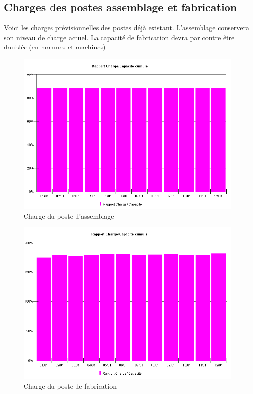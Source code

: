 \documentclass[a4paper]{../TPInsa}
\begin{document}
	\subsection{Charges des postes assemblage et fabrication}
	Voici les charges prévisionnelles des postes déjà existant. L'assemblage conservera son niveau de charge actuel. La capacité de fabrication devra par contre être doublée (en hommes et machines). 
	
	\begin{figure}[H]
	\centering
	\includegraphics[scale=0.6]{captures/charge_ass.PNG}
	\caption{Charge du poste d'assemblage}
	\end{figure}
	
	\begin{figure}[H]
	\centering
	\includegraphics[scale=0.6]{captures/charge_fab.PNG}
	\caption{Charge du poste de fabrication}
	\end{figure}
	
\end{document}
